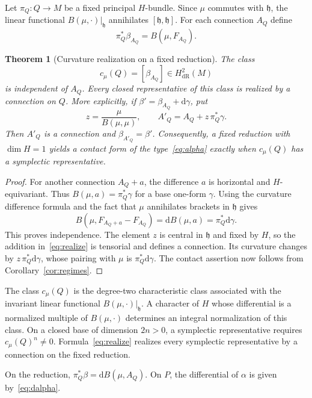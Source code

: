 \documentclass[11pt,a4paper]{article}
\numberwithin{equation}{section}
\newtheorem{theorem}{Theorem}[section]
\theoremstyle{definition}
\theoremstyle{remark}
\newcommand{\h}{\mathfrak h}
\newcommand{\dd}{\mathrm d}
\begin{document}
Let $\pi_Q:Q\to M$ be a fixed principal $H$-bundle. Since $\mu$ commutes with
$\h$, the linear functional $B(\mu,\cdot)|_\h$ annihilates
$[\h,\h]$. For each connection $A_Q$ define
\[
 \pi_Q^*\beta_{A_Q}=B(\mu,F_{A_Q}).
\]

\begin{theorem}[Curvature realization on a fixed reduction]\label{thm:realize}
The class
\begin{equation}\label{eq:cclass}
 c_\mu(Q)=[\beta_{A_Q}]\in H^2_{\mathrm{dR}}(M)
\end{equation}
is independent of $A_Q$. Every closed representative of this class is realized
by a connection on $Q$. More explicitly, if
$\beta'=\beta_{A_Q}+\dd\gamma$, put
\begin{equation}\label{eq:realize}
 z=\frac{\mu}{B(\mu,\mu)},\qquad
 A'_Q=A_Q+z\,\pi_Q^*\gamma.
\end{equation}
Then $A'_Q$ is a connection and $\beta_{A'_Q}=\beta'$.
Consequently, a fixed reduction with $\dim H=1$ yields a contact form of
the type~\eqref{eq:alpha} exactly when $c_\mu(Q)$ has a symplectic
representative.
\end{theorem}

\begin{proof}
For another connection $A_Q+a$, the difference $a$ is horizontal and
$H$-equivariant. Thus $B(\mu,a)=\pi_Q^*\gamma$ for a base one-form $\gamma$.
Using the curvature difference formula and the fact that $\mu$ annihilates
brackets in $\h$ gives
\[
 B(\mu,F_{A_Q+a}-F_{A_Q})
 =\dd B(\mu,a)=\pi_Q^*\dd\gamma.
\]
This proves independence. The element $z$ is central in $\h$ and fixed by
$H$, so the addition in~\eqref{eq:realize} is tensorial and defines a
connection. Its curvature changes by $z\,\pi_Q^*\dd\gamma$, whose pairing with
$\mu$ is $\pi_Q^*\dd\gamma$. The contact assertion now follows from
Corollary~\ref{cor:regimes}.
\end{proof}

The class $c_\mu(Q)$ is the degree-two characteristic class associated with the
invariant linear functional $B(\mu,\cdot)|_\h$. A character of $H$ whose differential is a normalized multiple of
$B(\mu,\cdot)$ determines an integral normalization of this class. On a closed base of
dimension $2n>0$, a symplectic representative requires
$c_\mu(Q)^n\ne0$. Formula~\eqref{eq:realize} realizes every symplectic representative
by a connection on the fixed reduction.

On the reduction, $\pi_Q^*\beta=\dd B(\mu,A_Q)$.
On $P$, the differential of $\alpha$ is given by~\eqref{eq:dalpha}.
\end{document}
